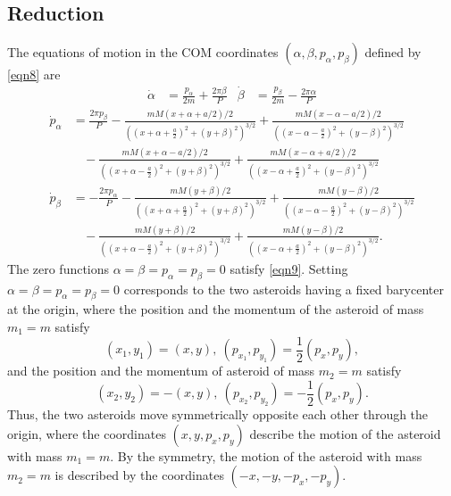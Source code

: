\documentclass[12pt]{article}
\begin{document}
\subsection{Reduction}
The equations of motion in the COM coordinates $(\alpha,\beta,p_\alpha,p_\beta)$ defined by \eqref{eqn8} are
\begin{align*}
\dot{\alpha} & = \frac{p_\alpha}{2m} + \frac{2\pi \beta}{P} & 
\dot{\beta} & = \frac{p_\beta}{2m} - \frac{2\pi \alpha}{P}
\end{align*}
\begin{align}
\dot{p}_{\alpha} & = \frac{2\pi p_\beta}{P} - \frac{mM(x+\alpha + a/2)/2}{({(x + \alpha + \frac{a}{2})^2 + (y+\beta)^2})^{3/2}} + \frac{mM(x-\alpha - a/2)/2}{((x - \alpha - \frac{a}{2})^2 + (y-\beta)^2)^{3/2}}\nonumber\\
& \ \ \ \ - \frac{mM(x+\alpha - a/2)/2}{((x + \alpha - \frac{a}{2})^2 + (y+\beta)^2)^{3/2}} + \frac{mM(x-\alpha + a/2)/2}{((x - \alpha + \frac{a}{2})^2 + (y-\beta)^2)^{3/2}}\nonumber\\
\dot{p}_{\beta} & = -\frac{2\pi p_\alpha}{P} - \frac{mM(y+\beta)/2}{((x + \alpha + \frac{a}{2})^2 + (y+\beta)^2)^{3/2}} + \frac{mM(y-\beta)/2}{((x - \alpha - \frac{a}{2})^2 + (y-\beta)^2)^{3/2}}\nonumber\\
& \ \ \ \ - \frac{mM(y+\beta)/2}{((x + \alpha - \frac{a}{2})^2 + (y+\beta)^2)^{3/2}} + \frac{mM(y-\beta)/2}{((x - \alpha + \frac{a}{2})^2 + (y-\beta)^2)^{3/2}}.
\label{eqn9}
\end{align}
The zero functions $\alpha = \beta = p_\alpha = p_\beta = 0$ satisfy \eqref{eqn9}. Setting $\alpha=\beta=p_\alpha=p_\beta = 0$ corresponds to the two asteroids having a fixed barycenter at the origin, where the position and the momentum of the asteroid of mass $m_1 = m$ satisfy
\[ (x_1,y_1) = (x,y),\  (p_{x_1},p_{y_1}) = \frac{1}{2}(p_x,p_y),\]
and the position and the momentum of asteroid of mass $m_2=m$ satisfy
\[ (x_2,y_2) = -(x,y),\ (p_{x_2},p_{y_2}) = -\frac{1}{2} (p_x,p_y). \]
Thus, the two asteroids move symmetrically opposite each other through the origin, where the coordinates $(x,y,p_x,p_y)$ describe the motion of the asteroid with mass $m_1=m$. By the symmetry, the motion of the asteroid with mass $m_2=m$ is described by the coordinates $(-x,-y,-p_x,-p_y)$.
\end{document}

